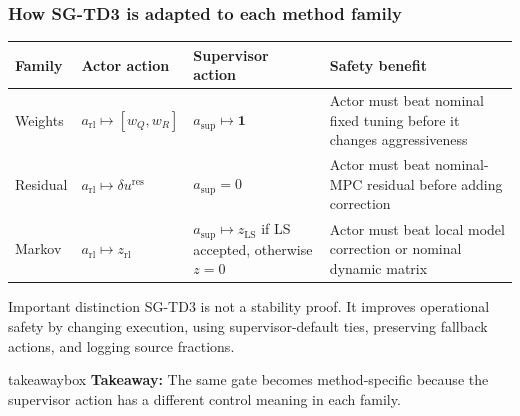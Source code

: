 \documentclass[aspectratio=169]{beamer}
\newcommand{\takeawaybox}[1]{%
\vspace{0.02cm}
\begin{center}
\begin{beamercolorbox}[wd=0.94\textwidth,sep=3pt,center,rounded=true,shadow=false]{takeawaybox}
\scriptsize
\textbf{\textcolor{maroon1}{Takeaway:}} #1
\end{beamercolorbox}
\end{center}
}
\begin{document}
\begin{frame}
\frametitle{\large \textbf{How SG-TD3 is adapted to each method family}}
\scriptsize

\begin{center}
\tiny
\renewcommand{\arraystretch}{1.18}
\begin{tabular}{p{}p{}p{}p{}}
\toprule
\textbf{Family} & \textbf{Actor action} & \textbf{Supervisor action} & \textbf{Safety benefit}\\
\midrule
Weights &
\(a_{\mathrm{rl}}\mapsto [w_Q,w_R]\) &
\(a_{\mathrm{sup}}\mapsto \mathbf{1}\) &
Actor must beat nominal fixed tuning before it changes aggressiveness\\
\addlinespace
Residual &
\(a_{\mathrm{rl}}\mapsto \delta u^{\mathrm{res}}\) &
\(a_{\mathrm{sup}}=0\) &
Actor must beat nominal-MPC residual before adding correction\\
\addlinespace
Markov &
\(a_{\mathrm{rl}}\mapsto z_{\mathrm{rl}}\) &
\(a_{\mathrm{sup}}\mapsto z_{\mathrm{LS}}\) if LS accepted, otherwise \(z=0\) &
Actor must beat local model correction or nominal dynamic matrix\\
\bottomrule
\end{tabular}
\end{center}

\vspace{0.1cm}

\begin{block}{Important distinction}
SG-TD3 is not a stability proof. It improves operational safety by changing execution, using supervisor-default ties, preserving fallback actions, and logging source fractions.
\end{block}

\takeawaybox{The same gate becomes method-specific because the supervisor action has a different control meaning in each family.}
\end{frame}
\end{document}
